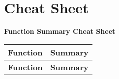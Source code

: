 \documentclass[openany,12pt]{book}
\begin{document}
\part{Cheat Sheet}


\begin{center}
  \textbf{Function Summary Cheat Sheet}
\end{center}
\vspace{-2em}

\renewcommand{\arraystretch}{1.2} %
\begin{longtable}{|>{\raggedright\arraybackslash}p{3cm}|>{\raggedright\arraybackslash}p{12cm}|}
  \hline
  \rowcolor{RoyalBlue!25}
  \textbf{Function} & \textbf{Summary}                                                                                  \\
  \endfirsthead

  \hline
  \textbf{Function} & \textbf{Summary}                                                                                  \\
  \endhead


\end{longtable}
\end{document}
